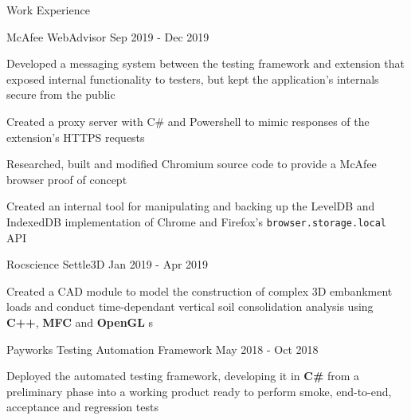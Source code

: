 \documentclass{resume} %
\begin{document}
\begin{rSection}{Work Experience}
    \begin{workexperience}
        {McAfee}
        {WebAdvisor}
        {Sep 2019 - Dec 2019}
        {
            \item Developed a messaging system between the testing framework and extension that exposed internal functionality to testers, but kept the application's internals secure from the public
            \item Created a proxy server with C\# and Powershell to mimic responses of the extension's HTTPS requests  
            \item Researched, built and modified Chromium source code to provide a McAfee browser proof of concept 
            \item Created an internal tool for manipulating and backing up the LevelDB and IndexedDB implementation of Chrome and Firefox's \texttt{browser.storage.local} API
        }
    \end{workexperience}

    \begin{workexperience}
        {Rocscience}
        {Settle3D}
        {Jan 2019 - Apr 2019}
        {
            \item Created a CAD module to model the construction of complex 3D embankment loads and 
            conduct time-dependant vertical soil consolidation analysis using \textbf{C++}, \textbf{MFC} and \textbf{OpenGL}
s        }
    \end{workexperience}
    
    \begin{workexperience}
        {Payworks}
        {Testing Automation Framework}
        {May 2018 - Oct 2018}
        {
            \item Deployed the automated testing framework, developing it in \textbf{C\#} from a preliminary phase into a working product ready to perform smoke, end-to-end, acceptance and regression tests
        }
    \end{workexperience}

    \vspace{1em}

\end{rSection}



\end{document}

